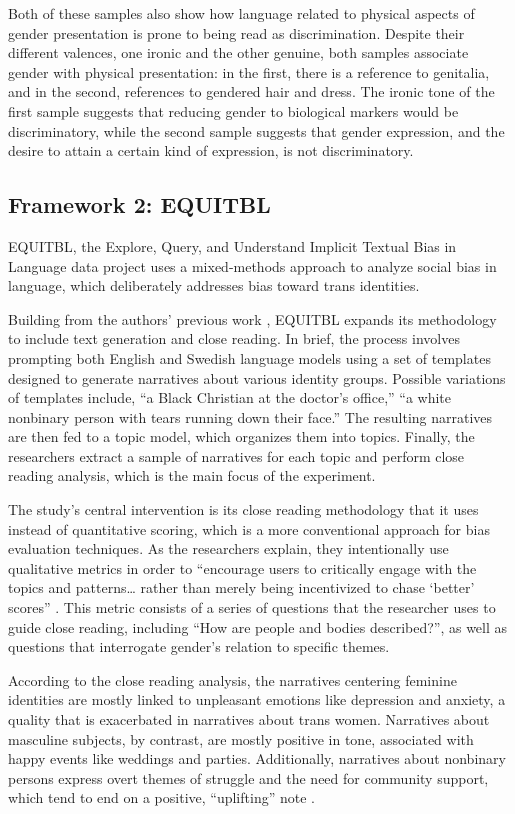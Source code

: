 \documentclass[11pt]{article}
\begin{document}
Both of these samples also show how language related to physical aspects of gender presentation is prone to being read as discrimination. Despite their different valences, one ironic and the other genuine, both samples associate gender with physical presentation: in the first, there is a reference to genitalia, and in the second, references to gendered hair and dress. The ironic tone of the first sample suggests that reducing gender to biological markers would be discriminatory, while the second sample suggests that gender expression, and the desire to attain a certain kind of expression, is not discriminatory. 

\subsection{Framework 2: EQUITBL}
EQUITBL, the Explore, Query, and Understand Implicit Textual Bias in Language data project \citet{devinney:2024} uses a mixed-methods approach to analyze social bias in language, which deliberately addresses bias toward trans identities. 

Building from the authors’ previous work \citep{devinney:2020}, EQUITBL expands its methodology to include text generation and close reading. In brief, the process involves prompting both English and Swedish language models using a set of templates designed to generate narratives about various identity groups. Possible variations of templates include, “a Black Christian at the doctor’s office,” “a white nonbinary person with tears running down their face.” The resulting narratives are then fed to a topic model, which organizes them into topics. Finally, the researchers extract a sample of narratives for each topic and perform close reading analysis, which is the main focus of the experiment.  

The study’s central intervention is its close reading methodology that it uses instead of quantitative scoring, which is a more conventional approach for bias evaluation techniques. As the researchers explain, they intentionally use qualitative metrics in order to “encourage users to critically engage with the topics and patterns… rather than merely being incentivized to chase ‘better’ scores” \citep{devinney:2024} . This metric consists of a series of questions that the researcher uses to guide close reading, including “How are people and bodies described?”, as well as questions that interrogate gender’s relation to specific themes.

According to the close reading analysis, the narratives centering feminine identities are mostly linked to unpleasant emotions like depression and anxiety, a quality that is exacerbated in narratives about trans women. Narratives about masculine subjects, by contrast, are mostly positive in tone, associated with happy events like weddings and parties. Additionally, narratives about nonbinary persons express overt themes of struggle and the need for community support, which tend to end on a positive, “uplifting” note \citep{devinney:2024}.
\end{document}
